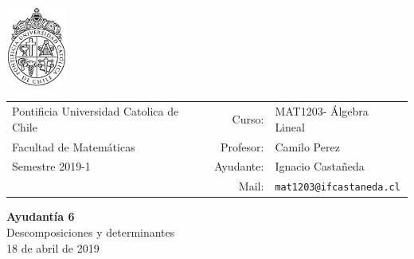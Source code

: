 \documentclass[12pt]{article}
\makeatletter
\newcommand{\ayudantia}{{\sc Ayudantía 6}}
\newcommand{\tituloayu}{Descomposiciones y determinantes}
\newcommand{\fecha}{18 de abril de 2019}
\newcommand{\sigla}{MAT1203}
\newcommand{\nombre}{Álgebra Lineal}
\newcommand{\profesor}{Camilo Perez}
\newcommand{\ano}{2019}
\newcommand{\semestre}{1}
\newcommand{\mail}{mat1203@ifcastaneda.cl}
\makeatother
\begin{document}
\thispagestyle{empty}

\begin{minipage}{2cm}
	\includegraphics[width=2cm]{../../../../img/logo.pdf}
	\vspace{0.5cm}
\end{minipage}
\begin{minipage}{\linewidth}
	\begin{tabular}{lrl}
		{\scriptsize\sc Pontificia Universidad Catolica de Chile} & \hspace*{0.7in}Curso: &
		\sigla  - \nombre\\
		{\sc Facultad de Matemáticas}&
		Profesor: & \profesor \\
		{\sc Semestre \ano-\semestre} & Ayudante: & {Ignacio Castañeda}\\
		& {Mail:} & \texttt{\mail}
	\end{tabular}
\end{minipage}

\vspace{-10mm}
\begin{center}
	{\LARGE\bf \ayudantia}\\
	\vspace{0.1cm}
	{\tituloayu}\\
	\vspace{0.1cm}
	\fecha\\
	\vspace{0.4cm}
\end{center}
\end{document}
